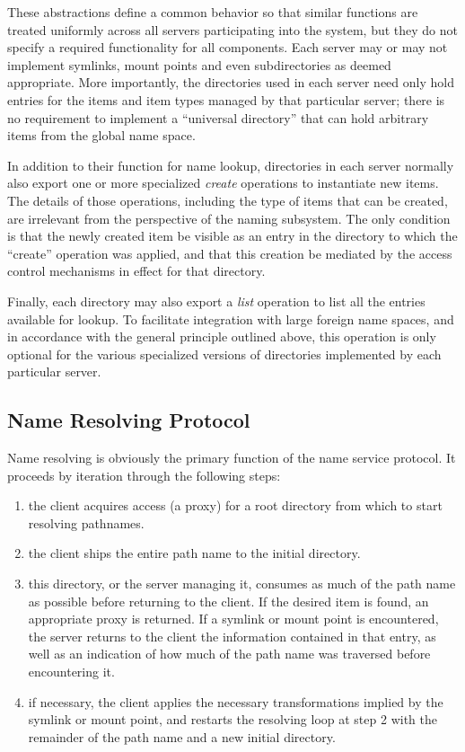 These abstractions define a common behavior so that similar functions
are treated uniformly across all servers participating into the
system, but they do not specify a required functionality for all
components.  Each server may or may not implement symlinks, mount
points and even subdirectories as deemed appropriate.  More
importantly, the directories used in each server need only hold
entries for the items and item types managed by that particular
server; there is no requirement to implement a ``universal directory''
that can hold arbitrary items from the global name space.

In addition to their function for name lookup, directories in each
server normally also export one or more specialized {\em create}
operations to instantiate new items. The details of those operations,
including the type of items that can be created, are irrelevant from
the perspective of the naming subsystem. The only condition is that
the newly created item be visible as an entry in the directory to
which the ``create'' operation was applied, and that this creation be
mediated by the access control mechanisms in effect for that
directory.

Finally, each directory may also export a {\em list} operation to list
all the entries available for lookup. To facilitate integration with
large foreign name spaces, and in accordance with the general
principle outlined above, this operation is only optional for the
various specialized versions of directories implemented by each
particular server.

\subsection{Name Resolving Protocol}

Name resolving is obviously the primary function of the name service
protocol. It proceeds by iteration through the following steps:
\begin{enumerate}

\item the client acquires access (a proxy) for a root directory from
which to start resolving pathnames.

\item the client ships the entire path name to the initial directory.

\item this directory, or the server managing it, consumes as much of
the path name as possible before returning to the client. If the
desired item is found, an appropriate proxy is returned. If a symlink
or mount point is encountered, the server returns to the client the
information contained in that entry, as well as an indication of how
much of the path name was traversed before encountering it.

\item if necessary, the client applies the necessary transformations
implied by the symlink or mount point, and restarts the resolving loop
at step 2 with the remainder of the path name and a new initial
directory.

\end{enumerate}

